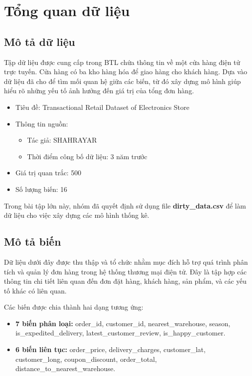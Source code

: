 \section{Tổng quan dữ liệu}
\subsection{Mô tả dữ liệu}
Tập dữ liệu được cung cấp trong BTL chứa thông tin về một cửa hàng điện tử trực tuyến. Cửa hàng có ba kho hàng hóa để giao hàng cho khách hàng. Dựa vào dữ liệu đã cho để tìm mối quan hệ giữa các biến, từ đó xây dựng mô hình giúp hiểu rõ những yếu tố ảnh hưởng đến giá trị của tổng đơn hàng.

\begin{itemize}
    \item Tiêu đề: Transactional Retail Dataset of Electronics Store
    \item Thông tin nguồn:
        \begin{itemize}
            \item Tác giả: SHAHRAYAR
            \item Thời điểm công bố dữ liệu: 3 năm trước
        \end{itemize}
    \item Giá trị quan trắc: 500
    \item Số lượng biến: 16
\end{itemize}
Trong bài tập lớn này, nhóm đã quyết định sử dụng file \textbf{dirty\_data.csv} để làm dữ liệu cho việc xây dựng các mô hình thống kê.
\subsection{Mô tả biến}
Dữ liệu dưới đây được thu thập và tổ chức nhằm mục đích hỗ trợ quá trình phân tích và quản lý đơn hàng trong hệ thống thương mại điện tử. Đây là tập hợp các thông tin chi tiết liên quan đến đơn đặt hàng, khách hàng, sản phẩm, và các yếu tố khác có liên quan.

Các biến được chia thành hai dạng tương ứng:
\begin{itemize}
    \item \textbf{7 biến phân loại:} order\_id, customer\_id, nearest\_warehouse, season, is\_expedited\_delivery, latest\_customer\_review, is\_happy\_customer.
    \item \textbf{6 biến liên tục:} order\_price, delivery\_charges, customer\_lat, customer\_long, coupon\_discount, order\_total, distance\_to\_nearest\_warehouse. 
\end{itemize}

